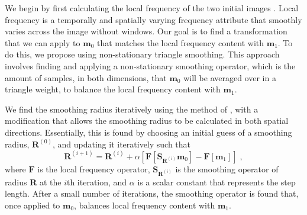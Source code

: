 We begin by first calculating the local frequency of the two initial images \cite[]{attr}. 
Local frequency is a temporally and spatially varying frequency attribute that smoothly varies across the image without windows.
Our goal is to find a transformation that we can apply to $\mathbf{m}_0$ that matches the local frequency content with $\mathbf{m}_1$. 
To do this, we propose using non-stationary triangle smoothing. 
This approach involves finding and applying a non-stationary smoothing operator, which is the amount of samples, in both dimensions, that $\mathbf{m}_0$ will be averaged over in a triangle weight, to balance the local frequency content with $\mathbf{m}_1$. 

We find the smoothing radius iteratively using the method of \cite{locfreq}, with a modification that allows the smoothing radius to be calculated in both spatial directions. 
Essentially, this is found by choosing an initial guess of a smoothing radius, $\mathbf{R}^{(0)}$, and updating it iteratively such that 
    \begin{equation}
        \label{eq:it}
\mathbf{R}^{(i+1)} = \mathbf{R}^{(i)}+ \alpha \left [ \mathbf{F}[\mathbf{S}_{\mathbf{R}^{(i)}} \mathbf{m}_0] - \mathbf{F}[\mathbf{m}_1] \right ]\;,
    \end{equation}
    where $\mathbf{F}$ is the local frequency operator, $\mathbf{S}_{\mathbf{R}^{(i)}}$ is the smoothing operator of radius $\mathbf{R}$ at the $i$th iteration, and $\alpha$ is a scalar constant that represents the step length.
    After a small number of iterations, the smoothing operator is found that, once applied to $\mathbf{m}_0$, balances local frequency content with $\mathbf{m}_1$.



